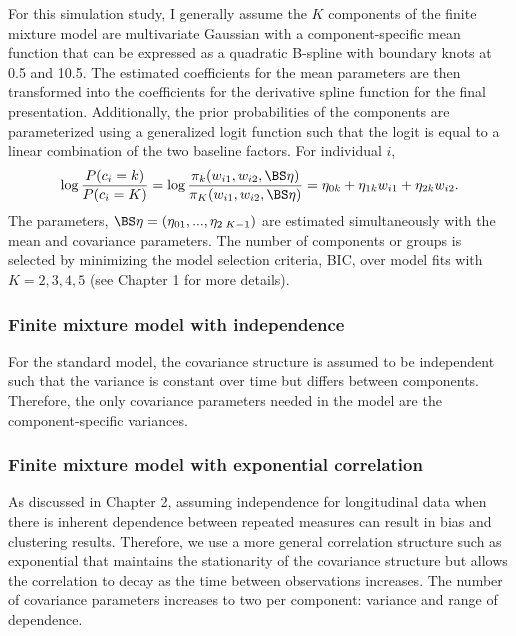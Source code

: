 For this simulation study, I generally assume the $K$ components of the finite mixture model are multivariate Gaussian with a component-specific mean function that can be expressed as a quadratic B-spline with boundary knots at 0.5 and 10.5. The estimated coefficients for the mean parameters are then transformed into the coefficients for the derivative spline function for the final presentation. Additionally, the prior probabilities of the components are parameterized using a generalized logit function such that the logit is equal to a linear combination of the two baseline factors. For individual $i$, 
$$\log\frac{P(c_{i}=k)}{P(c_{i}=K)} = \log\frac{\pi_{k}(w_{i1},w_{i2},\BS\eta)}{\pi_{K}(w_{i1},w_{i2},\BS\eta)} =  \eta_{0k}+\eta_{1k}w_{i1}+\eta_{2k}w_{i2}.$$
The parameters, $\BS\eta=(\eta_{01},...,\eta_{2\; K-1})$ are estimated simultaneously with the mean and covariance parameters. 
The number of components or groups is selected by minimizing the model selection criteria, BIC, over model fits with $K=2,3,4,5$ (see Chapter 1 for more details). 

\subsubsection{Finite mixture model with independence}
For the standard model, the covariance structure is assumed to be independent such that the variance is constant over time but differs between components. Therefore, the only covariance parameters needed in the model are the component-specific variances.

\subsubsection{Finite mixture model with exponential correlation}
As discussed in Chapter 2, assuming independence for longitudinal data when there is inherent dependence between repeated measures can result in bias and clustering results. Therefore, we use a more general correlation structure such as exponential that maintains the stationarity of the covariance structure but allows the correlation to decay as the time between observations increases. The number of covariance parameters increases to two per component: variance and range of dependence. 

